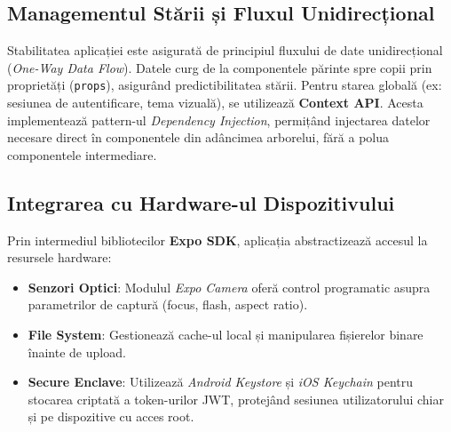 \subsection{Managementul Stării și Fluxul Unidirecțional}
Stabilitatea aplicației este asigurată de principiul fluxului de date unidirecțional (\textit{One-Way Data Flow}). Datele curg de la componentele părinte spre copii prin proprietăți (\texttt{props}), asigurând predictibilitatea stării.
Pentru starea globală (ex: sesiunea de autentificare, tema vizuală), se utilizează \textbf{Context API}. Acesta implementează pattern-ul \textit{Dependency Injection}, permițând injectarea datelor necesare direct în componentele din adâncimea arborelui, fără a polua componentele intermediare.

\subsection{Integrarea cu Hardware-ul Dispozitivului}
Prin intermediul bibliotecilor \textbf{Expo SDK}, aplicația abstractizează accesul la resursele hardware:
\begin{itemize}
    \item \textbf{Senzori Optici}: Modulul \textit{Expo Camera} oferă control programatic asupra parametrilor de captură (focus, flash, aspect ratio).
    \item \textbf{File System}: Gestionează cache-ul local și manipularea fișierelor binare înainte de upload.
    \item \textbf{Secure Enclave}: Utilizează \textit{Android Keystore} și \textit{iOS Keychain} pentru stocarea criptată a token-urilor JWT, protejând sesiunea utilizatorului chiar și pe dispozitive cu acces root.
\end{itemize}